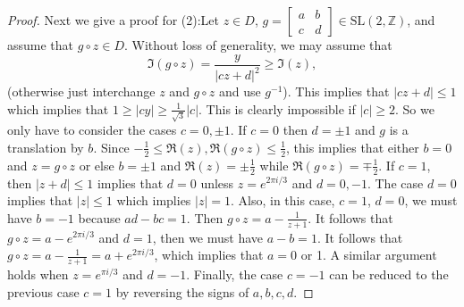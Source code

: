 \documentclass[12pt]{article} %
\begin{document}
\begin{proof}
  Next we give a proof for (2):Let $z \in D$, $g = \begin{bmatrix} a & b \\ c & d \end{bmatrix} \in \mathrm{SL}(2, \mathbb{Z})$, and assume that $g \circ z \in D$. Without loss of generality, we may assume that
  \[
    \Im(g \circ z) = \frac{y}{|cz + d|^2} \geq \Im(z),
  \]
  (otherwise just interchange $z$ and $g \circ z$ and use $g^{-1}$). This implies that $|cz + d| \leq 1$ which implies that $1 \geq |cy| \geq \frac{1}{\sqrt{3}}|c|$. This is clearly impossible if $|c| \geq 2$. So we only have to consider the cases $c = 0, \pm 1$. If $c = 0$ then $d = \pm 1$ and $g$ is a translation by $b$. Since $-\frac{1}{2} \leq \Re(z), \Re(g \circ z) \leq \frac{1}{2}$, this implies that either $b = 0$ and $z = g \circ z$ or else $b = \pm 1$ and $\Re(z) = \pm \frac{1}{2}$ while $\Re(g \circ z) = \mp \frac{1}{2}$. If $c = 1$, then $|z + d| \leq 1$ implies that $d = 0$ unless $z = e^{2\pi i / 3}$ and $d = 0, -1$. The case $d = 0$ implies that $|z| \leq 1$ which implies $|z| = 1$. Also, in this case, $c = 1$, $d = 0$, we must have $b = -1$ because $ad - bc = 1$. Then $g \circ z = a - \frac{1}{z + 1}$. It follows that $g \circ z = a - e^{2\pi i / 3}$ and $d = 1$, then we must have $a - b = 1$. It follows that $g \circ z = a - \frac{1}{z + 1} = a + e^{2\pi i / 3}$, which implies that $a = 0$ or 1. A similar argument holds when $z = e^{\pi i / 3}$ and $d = -1$. Finally, the case $c = -1$ can be reduced to the previous case $c = 1$ by reversing the signs of $a, b, c, d$.
\end{proof}
\end{document}
